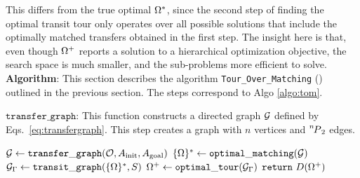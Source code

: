 This differs from the true optimal $ \scoma^* $, since the second step of finding the optimal transit tour only operates over all possible solutions that include the optimally matched transfers obtained in the first step.
The insight here is that, even though $ \scoma^+ $ reports a solution to a hierarchical optimization objective, 
the search space is much smaller, and the sub-problems more efficient to solve.\\


\noindent\textbf{Algorithm}: This section describes the algorithm {\tt {Tour\_Over\_Matching}} (\algo) outlined in the previous section. The steps correspond to Algo \ref{algo:tom}. 

\noindent $ \mathtt{transfer\_graph} $: This function constructs a directed graph $ \graph $ defined by Eqs.~\ref{eq:transfergraph}. This step creates a graph with $ n $ vertices and $ \permu[n]{2} $ edges.

    \begin{algorithm}[t]
    \caption{{\tt \algo}$ (\objectset, \startq, \ainit, \atarget) $}
    \label{algo:tom}
    $ \graph \leftarrow \mathtt{transfer\_graph}(\objectset, \ainit, \atarget) $\;
    $ \scomaset^* \leftarrow \mathtt{optimal\_matching}(\graph) $\;
    $ \tspgraph \leftarrow \mathtt{transit\_graph}(\scomaset^*, \startq) $\;
    $ \scoma^+\leftarrow\mathtt{optimal\_tour}(\tspgraph) $\;
    $ \mathbf{\mathtt{return}}\ \trajset(\scoma^+)$\;
    \end{algorithm}


